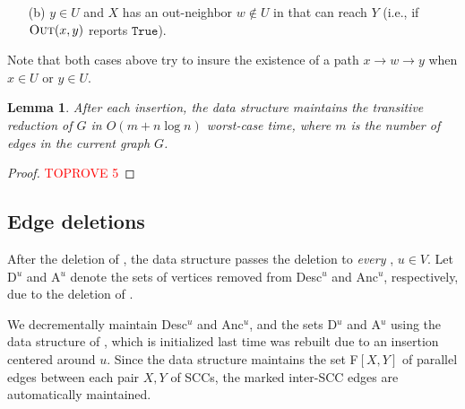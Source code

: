 \documentclass[11pt]{article}
\newtheorem{lemma}[theorem]{Lemma}
\newcommand{\graph}[1]{\text{\( G^{#1} \)\xspace}}
\newcommand{\TR}[0]{\text{\( G^{t} \)}\xspace}
\renewcommand{\textsc}[1]{\textnormal{\scshape #1}}
\newcommand{\desc}[1]{\textrm{{\normalfont Desc}\( ^{ #1 }\)}\xspace}
\newcommand{\D}[1]{\textrm{{\normalfont D}\(^{ #1 } \)}\xspace}
\newcommand{\anc}[1]{\textrm{{\normalfont Anc}\( ^{ #1 }\)}\xspace}
\newcommand{\A}[1]{\textrm{{\normalfont A}\( ^{ #1 } \)}\xspace}
\newcommand{\F}[2]{\textrm{F\( [ #1, #2 ]  \)}\xspace}
\begin{document}
{\begin{itemize}
\item[(b)]
$y \in U$ and \( X \) has an out-neighbor \( w \notin U \)  in \graph{u} that can reach \( Y \) (i.e., if $\textsc{Out}(x, y)$ reports $\texttt{True}$).
\end{itemize}
Note that both cases above try to insure the existence of a path \( x \to w \to y \) when \( x \in U \) or \( y \in U \).


















\begin{lemma} \label{lem:insertion_general}
After each insertion, the data structure maintains the transitive reduction \TR of \( G \) in \( O(m + n\log n) \) worst-case time, where \( m \) is the number of edges in the current graph \( G \).
\end{lemma}
\begin{proof}\textcolor{red}{TOPROVE 5}\end{proof}



\subsection{Edge deletions}
\label{subsub:deletion_general}


After the deletion of \Ed, the data structure passes the deletion to \emph{every} \graph{u}, \( u \in V \).
Let \D{u} and \A{u} denote the sets of vertices removed from \desc{u} and \anc{u}, respectively, due to the deletion of \Ed.





We decrementally maintain \desc{u} and \anc{u}, and the sets \D{u} and \A{u} using the data structure of , which is initialized last time \graph{u} was rebuilt due to an insertion centered around \( u \). 
Since the data structure maintains the set \F{X}{Y} of parallel edges between each pair \( X, Y \) of SCCs, the marked inter-SCC edges are automatically maintained.




}
\end{document}
